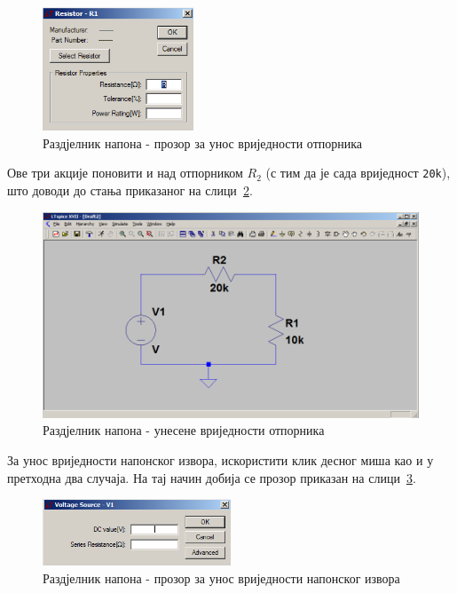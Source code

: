 \begin{figure}[h]
\centering
\includegraphics[width=0.4\textwidth]{figs/rn-rv1.PNG}
\caption{Раздјелник напона - прозор за унос вриједности отпорника}
\label{Fig:rn-rv1}
\end{figure}

Ове три акције поновити и над отпорником $R_2$ (с тим да је сада вриједност \texttt{20k}), што доводи до стања приказаног на слици~\ref{Fig:rn-rv2}.

\begin{figure}[h]
\centering
\includegraphics[width=\figwidth\textwidth]{figs/rn-rv2.PNG}
\caption{Раздјелник напона - унесене вриједности отпорника}
\label{Fig:rn-rv2}
\end{figure}

За унос вриједности напонског извора, искористити клик десног миша као и у претходна два случаја. На тај начин добија се прозор приказан на слици~\ref{Fig:rn-vv1}.

\begin{figure}[h]
\centering
\includegraphics[width=0.5\textwidth]{figs/rn-vv1.PNG}
\caption{Раздјелник напона - прозор за унос вриједности напонског извора}
\label{Fig:rn-vv1}
\end{figure}

